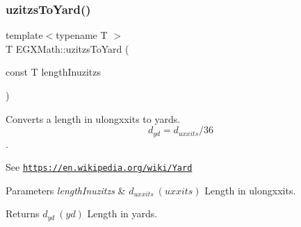 \subsubsection{\texorpdfstring{uzitzs\+To\+Yard()}{uzitzsToYard()}}
{\footnotesize\ttfamily template$<$typename T $>$ \\
T E\+G\+X\+Math\+::uzitzs\+To\+Yard (\begin{DoxyParamCaption}\item[{const T}]{length\+Inuzitzs }\end{DoxyParamCaption})}



Converts a length in ulongxxits to yards. \[ d_{yd}=d_{uxxits} / 36 \]. 

See \href{https://en.wikipedia.org/wiki/Yard}{\tt https\+://en.\+wikipedia.\+org/wiki/\+Yard} 
\begin{DoxyParams}{Parameters}
{\em length\+Inuzitzs} & $ d_{uxxits}\ (uxxits)$ Length in ulongxxits. \\
\hline
\end{DoxyParams}
\begin{DoxyReturn}{Returns}
$ d_{yd}\ (yd)$ Length in yards. 
\end{DoxyReturn}
